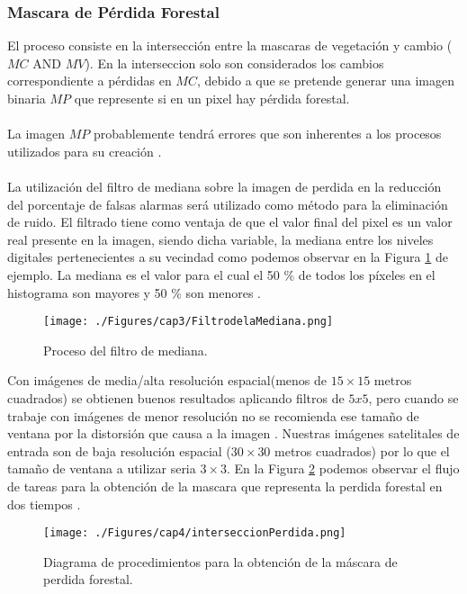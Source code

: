 \subsubsection{Mascara de P\'erdida Forestal}
El proceso consiste en la intersecci\'on entre la mascaras de vegetaci\'on y cambio ($ MC$ AND $MV $). En la interseccion solo son considerados los cambios correspondiente a p\'erdidas en $ MC $, debido a que se pretende generar una imagen binaria $ MP $ que represente si en un pixel hay p\'erdida forestal.\\~\\
La imagen $ MP $ probablemente tendr\'a errores que son inherentes a los procesos utilizados para su creación \cite{lovell2001filtering}. \\~\\
La utilizaci\'on del filtro de mediana sobre la imagen de perdida en la reducci\'on del porcentaje de falsas alarmas ser\'a utilizado como m\'etodo para la eliminaci\'on de ruido. El filtrado tiene como ventaja de que el valor final del pixel es un valor real presente en la imagen, siendo dicha variable, la mediana entre los niveles digitales pertenecientes a su vecindad como podemos observar en la Figura \ref{fig:filMediata} de ejemplo. La mediana es el valor para el cual el 50 \% de todos los p\'ixeles en el histograma son mayores y 50 \% son menores \cite{mehl1997fundamentos}.
\begin{figure}[H]
	\centering
	\texttt{[image: ./Figures/cap3/FiltrodelaMediana.png]}
	\caption{Proceso del filtro de mediana.}
	\label{fig:filMediata}
\end{figure}
 Con im\'agenes de media/alta resoluci\'on espacial(menos de $ 15 \times 15 $ metros cuadrados) se obtienen buenos resultados aplicando filtros de $ 5x5 $, pero cuando se trabaje con im\'agenes de menor resoluci\'on no se recomienda ese tama\~{n}o de ventana por la distorsi\'on que causa a la imagen \cite{martinez2013normalizacion}. Nuestras im\'agenes satelitales de entrada son de baja resoluci\'on espacial ($ 30 \times 30 $ metros cuadrados) por lo que el tama\~{n}o de ventana a utilizar seria $ 3 \times 3 $.
En la Figura \ref{fig:intersPerdida} podemos observar el flujo de tareas para la obtenci\'on de la mascara que representa la perdida forestal en dos tiempos .
\begin{figure}[H]
	\centering
	\texttt{[image: ./Figures/cap4/interseccionPerdida.png]}
	\caption{Diagrama de procedimientos para la obtenci\'on de la m\'ascara de perdida forestal.}
	\label{fig:intersPerdida}
\end{figure}

